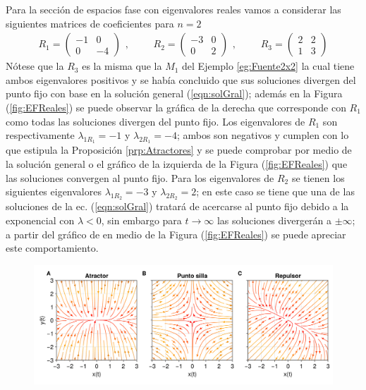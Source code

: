 \begin{ejemplo}\label{eg:EspaciosFreal}
	Para la sección de espacios fase con eigenvalores reales vamos a considerar las siguientes matrices de coeficientes para $n=2$
	\begin{equation*}
		\begin{split}
			R_1=\begin{pmatrix}
				-1 & 0\\
				0 & -4 
			\end{pmatrix}
		\end{split},\qquad
		\begin{split}
			R_2=\begin{pmatrix}
				-3 & 0\\
				0 & 2 			
			\end{pmatrix}
		\end{split},\qquad
		\begin{split}
			R_3=\begin{pmatrix}
					2 & 2\\
					1 & 3
			\end{pmatrix}
		\end{split}
	\end{equation*}
	Nótese que la $R_3$ es la misma que la $M_1$ del Ejemplo \ref{eg:Fuente2x2} la cual tiene ambos eigenvalores positivos y se había concluido que sus soluciones divergen del punto fijo con base en la solución general (\ref{eqn:solGral}); además en la Figura (\ref{fig:EFReales}) se puede observar la gráfica de la derecha que corresponde con $R_1$ como todas las soluciones divergen del punto fijo. Los eigenvalores de $R_1$ son respectivamente $\lambda_{1R_1}= -1$ y $\lambda_{2R_1}=-4$; ambos son negativos y cumplen con lo que estipula la Proposición \ref{prp:Atractores} y se puede comprobar por medio de la solución general o el gráfico de la izquierda de la Figura (\ref{fig:EFReales}) que las soluciones convergen al punto fijo. Para los eigenvalores de $R_2$ se tienen los siguientes eigenvalores $\lambda_{1R_2}=-3$ y $\lambda_{2R_2}=2$; en este caso se tiene que una de las soluciones de la ec. (\ref{eqn:solGral}) tratará de acercarse al punto fijo debido a la exponencial con $\lambda<0$, sin embargo para $t\to\infty$ las soluciones divergerán a $\pm\infty$; a partir del gráfico de en medio de la Figura (\ref{fig:EFReales}) se puede apreciar este comportamiento.
	\begin{figure}[h!]
		\centering
		\includegraphics[scale=0.23]{../../Imagenes/Espacios fase reales}

\end{figure}
\end{ejemplo}
